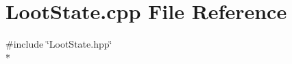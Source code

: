 \section{Loot\-State.\-cpp File Reference}
\label{_loot_state_8cpp}
{\ttfamily \#include \char`\"{}Loot\-State.\-hpp\char`\"{}}\\*
